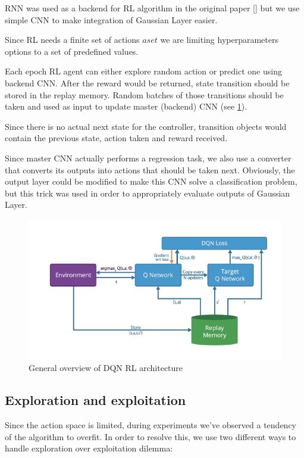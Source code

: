 RNN was used as a backend for RL algorithm in the original paper [\cite{ZophL16}] but we use simple CNN to make integration of Gaussian Layer easier.

Since RL needs a finite set of actions $aset$ we are limiting hyperparameters options to a set of predefined values.

Each epoch RL agent can either explore random action or predict one using backend CNN. After the reward would be returned, state transition should be stored in the replay memory. Random batches of those transitions should be taken and used as input to update master (backend) CNN (see \ref{fig:dqn}).

Since there is no actual next state for the controller, transition objects would contain the previous state, action taken and reward received.

Since master CNN actually performs a regression task, we also use a converter that converts its outputs into actions that should be taken next. Obviously, the output layer could be modified to make this CNN solve a classification problem, but this trick was used in order to appropriately evaluate outputs of Gaussian Layer.

\begin{figure}[!htb]
  \includegraphics[width=\linewidth]{images/dqn.png}
  \caption{General overview of DQN RL architecture}
  \label{fig:dqn}
\end{figure}


\subsection{Exploration and exploitation}

Since the action space is limited, during experiments we've observed a tendency of the algorithm to overfit. In order to resolve this, we use two different ways to handle exploration over exploitation dilemma:

